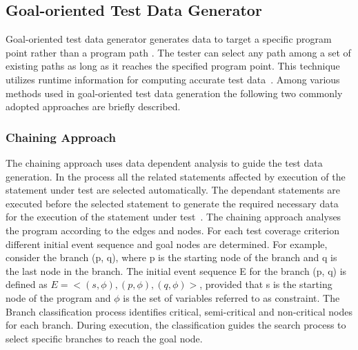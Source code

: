 

\subsection{Goal-oriented Test Data Generator}
\label{sec:goaloriented_2}
Goal-oriented test data generator generates data to target a specific program point rather than a program path \cite{chungautomated}. The tester can select any path among a set of existing paths as long as it reaches the specified program point. This technique utilizes runtime information for computing accurate test data~\cite{ferguson1996chaining}. Among various methods used in goal-oriented test data generation the following two commonly adopted approaches are briefly described.

\subsubsection{Chaining Approach}
The chaining approach uses data dependent analysis to guide the test data generation. In the process all the related statements affected by execution of the statement under test are selected automatically. The dependant statements are executed before the selected statement to generate the required necessary data for the execution of the statement under test~\cite{ferguson1996chaining}. The chaining approach analyses the program according to the edges and nodes. For each test coverage criterion different initial event sequence and goal nodes are determined. For example, consider  the branch (p, q), where p is  the starting node of the branch and q is the last node in the branch. The initial event sequence E for the branch (p, q) is defined as $E =< (s,\phi), (p,\phi),(q,\phi) >$, provided that s is the starting node of the program and $\phi$ is the set of variables referred to as constraint. The Branch classification process identifies critical, semi-critical and non-critical nodes for each branch. During execution, the classification guides the search process to select specific branches to reach the goal node.  


